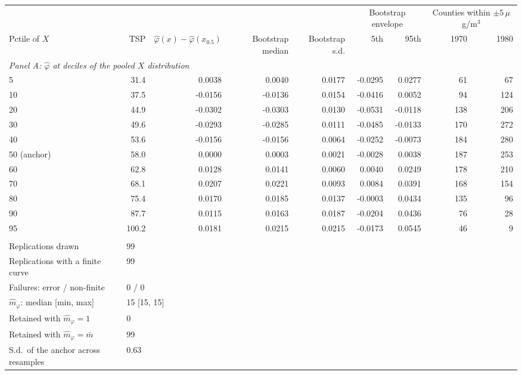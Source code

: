 \begin{tabular}{lrrrrrrrr}
\toprule
& & & & & \multicolumn{2}{c}{Bootstrap envelope} & \multicolumn{2}{c}{Counties within $\pm5\,\mu$g/m$^3$} \\
\cmidrule(lr){6-7} \cmidrule(lr){8-9}
Pctile of $X$ & TSP & $\hat\varphi(x)-\hat\varphi(x_{0.5})$ & Bootstrap median & Bootstrap s.d. & 5th & 95th & 1970 & 1980 \\
\midrule
\multicolumn{9}{l}{\textit{Panel A: $\hat\varphi$ at deciles of the pooled $X$ distribution}} \\
\midrule
5 & 31.4 & 0.0038 & 0.0040 & 0.0177 & -0.0295 & 0.0277 & 61 & 67 \\
10 & 37.5 & -0.0156 & -0.0136 & 0.0154 & -0.0416 & 0.0052 & 94 & 124 \\
20 & 44.9 & -0.0302 & -0.0303 & 0.0130 & -0.0531 & -0.0118 & 138 & 206 \\
30 & 49.6 & -0.0293 & -0.0285 & 0.0111 & -0.0485 & -0.0133 & 170 & 272 \\
40 & 53.6 & -0.0156 & -0.0156 & 0.0064 & -0.0252 & -0.0073 & 184 & 280 \\
50 (anchor) & 58.0 & 0.0000 & 0.0003 & 0.0021 & -0.0028 & 0.0038 & 187 & 253 \\
60 & 62.8 & 0.0128 & 0.0141 & 0.0060 & 0.0040 & 0.0249 & 178 & 210 \\
70 & 68.1 & 0.0207 & 0.0221 & 0.0093 & 0.0084 & 0.0391 & 168 & 154 \\
80 & 75.4 & 0.0170 & 0.0185 & 0.0137 & -0.0003 & 0.0434 & 135 & 96 \\
90 & 87.7 & 0.0115 & 0.0163 & 0.0187 & -0.0204 & 0.0436 & 76 & 28 \\
95 & 100.2 & 0.0181 & 0.0215 & 0.0215 & -0.0173 & 0.0545 & 46 & 9 \\
\addlinespace
\multicolumn{9}{l}{\textit{Panel B: bootstrap design and convergence}} \\
\midrule
Replications drawn & \multicolumn{8}{l}{99} \\
Replications with a finite curve & \multicolumn{8}{l}{99} \\
Failures: error / non-finite & \multicolumn{8}{l}{0 / 0} \\
$\hat m_\varphi$: median [min, max] & \multicolumn{8}{l}{15 [15, 15]} \\
Retained with $\hat m_\varphi = 1$ & \multicolumn{8}{l}{0} \\
Retained with $\hat m_\varphi = \bar m$ & \multicolumn{8}{l}{99} \\
S.d.\ of the anchor across resamples & \multicolumn{8}{l}{0.63} \\

\end{tabular}
